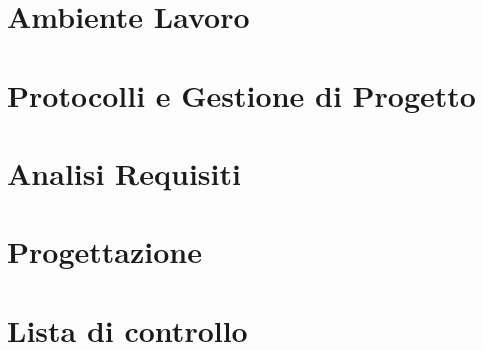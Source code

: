 \section{Ambiente Lavoro}


\newpage
\section{Protocolli e Gestione di Progetto}


\newpage
\section{Analisi Requisiti}


\newpage
\section{Progettazione}


%

\newpage
\appendix
\section{Lista di controllo}






